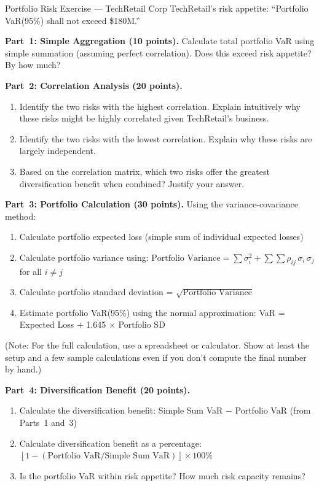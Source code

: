 \documentclass[11pt,openany]{book}
\providecommand{\tightlist}{\setlength{\itemsep}{0pt}\setlength{\parskip}{0pt}}
\begin{document}
\begin{minicase}{Portfolio Risk Exercise --- TechRetail Corp}
TechRetail's risk appetite: ``Portfolio VaR(95\%) shall not exceed \$180M.''

\medskip
\textbf{Part~1: Simple Aggregation (10 points).} Calculate total portfolio VaR
using simple summation (assuming perfect correlation). Does this exceed risk
appetite? By how much?

\medskip
\textbf{Part~2: Correlation Analysis (20 points).}
\begin{enumerate}[label=\alph*)]\tightlist
  \item Identify the two risks with the highest correlation. Explain
        intuitively why these risks might be highly correlated given
        TechRetail's business.
  \item Identify the two risks with the lowest correlation. Explain why these
        risks are largely independent.
  \item Based on the correlation matrix, which two risks offer the greatest
        diversification benefit when combined? Justify your answer.
\end{enumerate}

\medskip
\textbf{Part~3: Portfolio Calculation (30 points).} Using the
variance-covariance method:
\begin{enumerate}[label=\alph*)]\tightlist
  \item Calculate portfolio expected loss (simple sum of individual expected
        losses)
  \item Calculate portfolio variance using:
        \(\text{Portfolio Variance} = \sum \sigma_i^2 +
        \sum\sum \rho_{ij}\,\sigma_i\,\sigma_j\) for all \(i \neq j\)
  \item Calculate portfolio standard deviation =
        \(\sqrt{\text{Portfolio Variance}}\)
  \item Estimate portfolio VaR(95\%) using the normal approximation:
        VaR = Expected Loss + 1.645 \(\times\) Portfolio SD
\end{enumerate}
(Note: For the full calculation, use a spreadsheet or calculator. Show at
least the setup and a few sample calculations even if you don't compute the
final number by hand.)

\medskip
\textbf{Part~4: Diversification Benefit (20 points).}
\begin{enumerate}[label=\alph*)]\tightlist
  \item Calculate the diversification benefit: Simple Sum VaR \(-\) Portfolio
        VaR (from Parts~1 and~3)
  \item Calculate diversification benefit as a percentage:
        \([1 - (\text{Portfolio VaR} / \text{Simple Sum VaR})] \times 100\%\)
  \item Is the portfolio VaR within risk appetite? How much risk capacity
        remains?
\end{enumerate}


\end{minicase}
\end{document}
